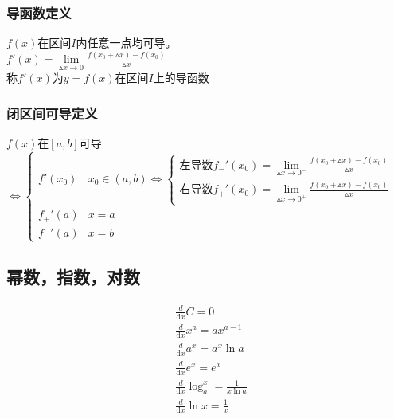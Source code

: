 \subsubsection{导函数定义}
$f(x)$在区间$I$内任意一点均可导。\\
$f'(x)=\lim\limits_{\vartriangle x\to 0}\frac{f(x_0+\vartriangle x)-f(x_0)}{\vartriangle x}$\\
称$f'(x)$为$y=f(x)$在区间$I$上的导函数
\subsubsection{闭区间可导定义}
$f(x)$在$[a,b]$可导$\Leftrightarrow\begin{cases}
  f'(x_0)  &x_0\in(a,b)\Leftrightarrow\begin{cases}
    \mbox{左导数}f_-'(x_0)=\lim\limits_{\vartriangle x\to 0^-}\frac{f(x_0+\vartriangle x)-f(x_0)}{\vartriangle x}\\
    \mbox{右导数}f_+'(x_0)=\lim\limits_{\vartriangle x\to 0^+}\frac{f(x_0+\vartriangle x)-f(x_0)}{\vartriangle x}
  \end{cases}\\
  f_+'(a) &x=a\\
  f_-'(a) &x=b
\end{cases}$
\subsection{幂数，指数，对数}
\begin{align}
&\frac{d}{\mathrm{d}{x}}C = 0\label{derivative_1} \\
&\frac{d}{\mathrm{d}{x}}x^a = ax^{a-1} \label{derivative_2} \\
&\frac{d}{\mathrm{d}{x}}a^x = a^x\ln a \label{derivative_3}\\
&\frac{d}{\mathrm{d}{x}}e^x = e^x \label{derivative_4}\\
&\frac{d}{\mathrm{d}{x}}\log_a^x = \frac{1}{x\ln a} \label{derivative_5}\\
&\frac{d}{\mathrm{d}{x}} \ln{x} = \frac{1}{x} \label{derivative_6}
\end{align}

